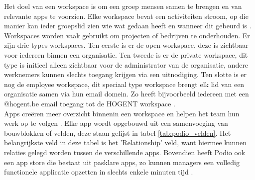 Het doel van een workspace is om een groep mensen samen te brengen en van relevante apps te voorzien. Elke workspace bevat een activiteiten stroom, op die manier kan ieder groepslid zien wie wat gedaan heeft en wanneer dit gebeurd is \autocite{TallyfyPodio}. Workspaces worden vaak gebruikt om projecten of bedrijven te onderhouden. Er zijn drie types workspaces. Ten eerste is er de open workspace, deze is zichtbaar voor iedereen binnen een organisatie. Ten tweede is er de private workspace, dit type is initieel alleen zichtbaar voor de administrator van de organisatie, andere werknemers kunnen slechts toegang krijgen via een uitnodiging. Ten slotte is er nog de employee workspace, dit speciaal type workspace brengt elk lid van een organisatie samen via hun email domein. Zo heeft bijvoorbeeld iedereen met een @hogent.be email toegang tot de HOGENT workspace \autocite{PodioFeatures}. \\

Apps creëren meer overzicht binnenin een workspace en helpen het team hun werk op te volgen \autocite{PodioFeatures}. Elke app wordt opgebouwd uit een samenvoeging van bouwblokken of velden, deze staan gelijst in tabel \ref{tab:podio_velden}. Het belangrijkste veld in deze tabel is het 'Relationship' veld, want hiermee kunnen relaties gelegd worden tussen de verschillende apps. Bovendien heeft Podio ook een app store die bestaat uit pasklare apps, zo kunnen managers een volledig functionele applicatie opzetten in slechts enkele minuten tijd \autocite{TallyfyPodio}. \\

